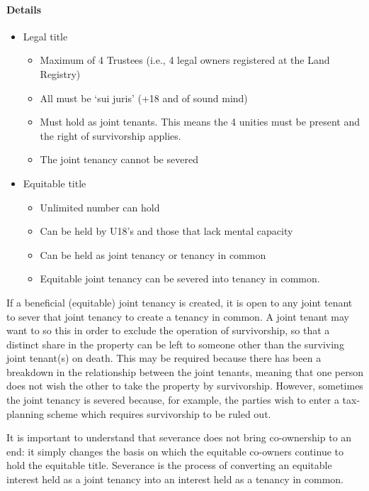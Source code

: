 \documentclass[
]{article}
\providecommand{\tightlist}{%
  \setlength{\itemsep}{0pt}\setlength{\parskip}{0pt}}
\begin{document}
\hypertarget{details}{%
\paragraph{Details}\label{details}}

\begin{itemize}
\tightlist
\item
  Legal title

  \begin{itemize}
  \tightlist
  \item
    Maximum of 4 Trustees (i.e., 4 legal owners registered at the Land
    Registry)
  \item
    All must be `sui juris' (+18 and of sound mind)
  \item
    Must hold as joint tenants. This means the 4 unities must be present
    and the right of survivorship applies.
  \item
    The joint tenancy cannot be severed
  \end{itemize}
\item
  Equitable title

  \begin{itemize}
  \tightlist
  \item
    Unlimited number can hold
  \item
    Can be held by U18's and those that lack mental capacity
  \item
    Can be held as joint tenancy or tenancy in common
  \item
    Equitable joint tenancy can be severed into tenancy in common.
  \end{itemize}
\end{itemize}

If a beneficial (equitable) joint tenancy is created, it is open to any
joint tenant to sever that joint tenancy to create a tenancy in common.
A joint tenant may want to so this in order to exclude the operation of
survivorship, so that a distinct share in the property can be left to
someone other than the surviving joint tenant(s) on death. This may be
required because there has been a breakdown in the relationship between
the joint tenants, meaning that one person does not wish the other to
take the property by survivorship. However, sometimes the joint tenancy
is severed because, for example, the parties wish to enter a
tax-planning scheme which requires survivorship to be ruled out.

It is important to understand that severance does not bring co-ownership
to an end: it simply changes the basis on which the equitable co-owners
continue to hold the equitable title. Severance is the process of
converting an equitable interest held as a joint tenancy into an
interest held as a tenancy in common.
\end{document}

